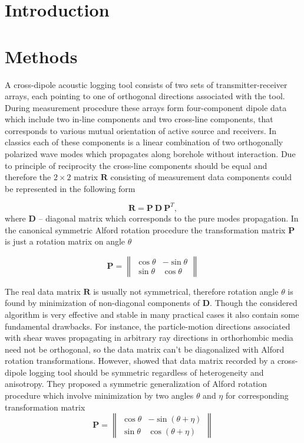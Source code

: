 \documentclass[a4paper,11pt]{article}
\begin{document}
\section{Introduction}

\section{Methods}
A cross-dipole acoustic logging tool consists of two sets of transmitter-receiver arrays, each pointing to one of orthogonal directions associated with the tool. During measurement procedure these arrays form four-component dipole data which include two in-line components and two cross-line components, that corresponds to various mutual orientation of active source and receivers. In classics each of these components is a linear combination of two orthogonally polarized wave modes which propagates along borehole without interaction. Due to principle of reciprocity the cross-line components should be equal and therefore the $2\times 2$ matrix $\mathbf{R}$ consisting of measurement data components could be represented in the following form

\begin{equation}
\mathbf{R} = \mathbf{P} \ \mathbf{D} \ \mathbf{P}^T, \label{eq:alford_symmetric} 
\end{equation}
where $\mathbf{D}$ -- diagonal matrix which corresponds to the pure modes propagation. In the canonical symmetric Alford rotation \cite{Alford1986} procedure the transformation matrix $\mathbf{P}$ is just a rotation matrix on angle $\theta$

\begin{equation*}
\mathbf{P} = \left\|
\begin{array}{cc}
\cos \theta &-\sin \theta \\ 
\sin \theta & \cos \theta
\end{array} 
\right\| 
\end{equation*}

The real data matrix $\mathbf{R}$ is usually not symmetrical, therefore rotation angle $\theta$ is found by minimization of non-diagonal components of $\mathbf{D}$. Though the considered algorithm is very effective and stable in many practical cases it also contain some fundamental drawbacks. For instance, the particle-motion directions associated with shear waves propagating in arbitrary ray directions in orthorhombic media need not be orthogonal, so the data matrix can't be diagonalized with Alford rotation transformations. However, \cite{Dellinger1997} showed that data matrix recorded by a cross-dipole logging tool should be symmetric regardless of heterogeneity and anisotropy. They proposed a symmetric generalization of Alford rotation procedure which involve minimization by two angles $\theta$ and $\eta$ for corresponding transformation matrix 
\begin{equation*}
\mathbf{P} = \left\|
\begin{array}{cc}
\cos \theta & -\sin (\theta+\eta) \\ 
\sin \theta & \cos (\theta+\eta)
\end{array} 
\right\|
\end{equation*}
\end{document}
